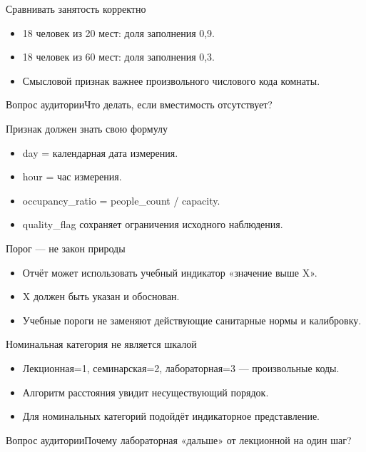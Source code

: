 \documentclass[aspectratio=169,10pt]{beamer}
\begin{document}
\begin{frame}[t]{Сравнивать занятость корректно}
\begin{itemize}
\item 18 человек из 20 мест: доля заполнения 0,9.
\vspace{4pt}
\item 18 человек из 60 мест: доля заполнения 0,3.
\vspace{4pt}
\item Смысловой признак важнее произвольного числового кода комнаты.
\vspace{4pt}
\end{itemize}
\vfill\begin{alertblock}{Вопрос аудитории}Что делать, если вместимость отсутствует?\end{alertblock}
\end{frame}
\begin{frame}[t]{Признак должен знать свою формулу}
\begin{itemize}
\item day = календарная дата измерения.
\vspace{4pt}
\item hour = час измерения.
\vspace{4pt}
\item occupancy\_ratio = people\_count / capacity.
\vspace{4pt}
\item quality\_flag сохраняет ограничения исходного наблюдения.
\vspace{4pt}
\end{itemize}
\end{frame}
\begin{frame}[t]{Порог — не закон природы}
\begin{itemize}
\item Отчёт может использовать учебный индикатор «значение выше X».
\vspace{4pt}
\item X должен быть указан и обоснован.
\vspace{4pt}
\item Учебные пороги не заменяют действующие санитарные нормы и калибровку.
\vspace{4pt}
\end{itemize}
\end{frame}
\begin{frame}[t]{Номинальная категория не является шкалой}
\begin{itemize}
\item Лекционная=1, семинарская=2, лабораторная=3 — произвольные коды.
\vspace{4pt}
\item Алгоритм расстояния увидит несуществующий порядок.
\vspace{4pt}
\item Для номинальных категорий подойдёт индикаторное представление.
\vspace{4pt}
\end{itemize}
\vfill\begin{alertblock}{Вопрос аудитории}Почему лабораторная «дальше» от лекционной на один шаг?\end{alertblock}
\end{frame}
\end{document}
